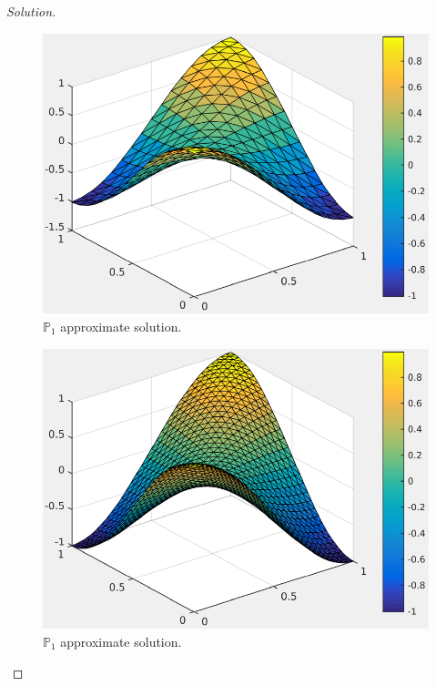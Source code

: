 \documentclass[11pt,a4paper,center,notitlepage]{article}
\numberwithin{equation}{section}
\begin{document}
\begin{proof}[Solution]
\begin{figure}[H]
\centering
\includegraphics[scale=0.9]{appro_solution_4_P1}
\caption{$\mathbb{P}_1$ approximate solution.}
\end{figure} 

\begin{figure}[H]
\centering
\includegraphics[scale=0.9]{appro_solution_5_P1}
\caption{$\mathbb{P}_1$ approximate solution.}
\end{figure} 


\end{proof}
\end{document}
